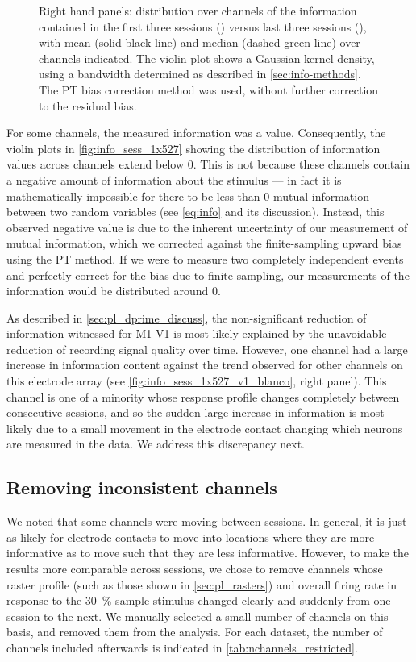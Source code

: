 \begin{figure}[htbp]
{Right hand panels: distribution over channels of the information contained in the first three sessions () versus last three sessions (), with mean (solid black line) and median (dashed green line) over channels indicated.
The violin plot shows a Gaussian kernel density, using a bandwidth determined as described in \autoref{sec:info-methods}.
The \ac{PT} bias correction method was used, without further correction to the residual bias.
}
    \label{fig:info_sess_1x527}
\end{figure}


For some channels, the measured information was a  value.
Consequently, the violin plots in \autoref{fig:info_sess_1x527} showing the distribution of information values across channels extend below \num{0}.
This is not because these channels contain a negative amount of information about the stimulus --- in fact it is mathematically impossible for there to be less than \num{0} mutual information between two random variables (see \autoref{eq:info} and its discussion).
Instead, this observed negative value is due to the inherent uncertainty of our measurement of mutual information, which we corrected against the finite-sampling upward bias using the \ac{PT} method.
If we were to measure two completely independent events and perfectly correct for the bias due to finite sampling, our measurements of the information would be distributed around \num{0}.

As described in \autoref{sec:pl_dprime_discuss}, the non-significant reduction of information witnessed for \ac{M1} \ac{V1} is most likely explained by the unavoidable reduction of recording signal quality over time.
However, one channel had a large increase in information content against the trend observed for other channels on this electrode array (see \autoref{fig:info_sess_1x527_v1_blanco}, right panel).
This channel is one of a minority whose response profile changes completely between consecutive sessions, and so the sudden large increase in information is most likely due to a small movement in the electrode contact changing which neurons are measured in the data.
We address this discrepancy next.


\subsection{Removing inconsistent channels}

We noted that some channels were moving between sessions.
In general, it is just as likely for electrode contacts to move into locations where they are more informative as to move such that they are less informative.
However, to make the results more comparable across sessions, we chose to remove channels whose raster profile (such as those shown in \autoref{sec:pl_rasters}) and overall firing rate in response to the \SI{30}{\percent} sample stimulus changed clearly and suddenly from one session to the next.
We manually selected a small number of channels on this basis, and removed them from the analysis.
For each dataset, the number of channels included afterwards is indicated in \autoref{tab:nchannels_restricted}.


